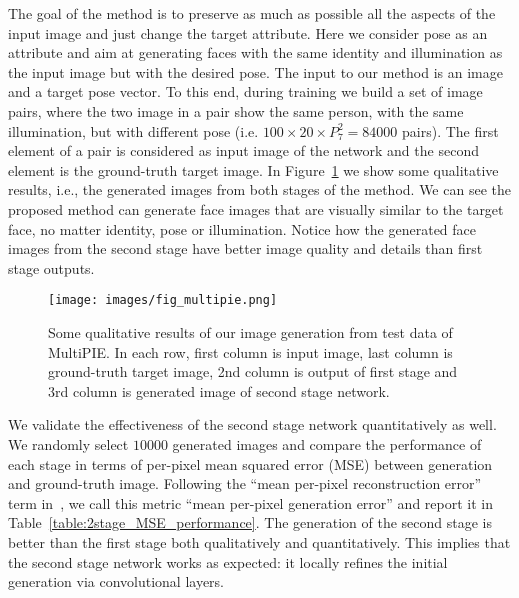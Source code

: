 \documentclass[10pt,twocolumn,letterpaper]{article}
\begin{document}
The goal of the method is to preserve as much as possible all the aspects of the input image and just change the target attribute. Here we consider pose as an attribute and aim at generating faces with the same identity and illumination as the input image but with the desired pose. The input to our method is an image and a target pose vector.
To this end, during training we build a set of image pairs, where the two image in a pair show the same person, with the same illumination, but with different pose (i.e. $100\times20\times P_{7}^{2}=84000$ pairs). The first element of a pair is considered as input image of the network and the second element is the ground-truth target image.
In Figure~\ref{fig:2stage_examples} we show some qualitative results, i.e., the generated images from both stages of the method. We can see the proposed method can generate face images that are visually similar to the target face, no matter identity, pose or illumination.
Notice how the generated face images from the second stage have better image quality and details than first stage outputs.

\begin{figure}[t]
\begin{center}
   \texttt{[image: images/fig\_multipie.png]}
\end{center}
\caption{Some qualitative results of our image generation from test data of MultiPIE. In each row, first column is input image, last column is ground-truth target image, 2nd column is output of first stage and 3rd column is generated image of second stage network.}
\label{fig:2stage_examples}
\end{figure}

We validate the effectiveness of the second stage network quantitatively as well. We randomly select $10000$ generated images and compare the performance of each stage in terms of per-pixel mean squared error (MSE) between generation and ground-truth image. Following the ``mean per-pixel reconstruction error'' term in~\cite{turmukhambetov2015modeling}, we call this metric ``mean per-pixel generation error'' and report it in Table~\ref{table:2stage_MSE_performance}. %
The generation of the second stage is better than the first stage both qualitatively and quantitatively.
This implies that the second stage network works as expected: it locally refines the initial generation via convolutional layers.
\end{document}
